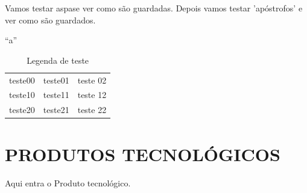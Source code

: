 \documentclass[
12pt,		%
openright,	%
twoside,  %
a4paper,			%
chapter=TITLE,		%
english,			%
french,				%
spanish,			%
brazil				%
]{USPSC-classe/USPSC}
\begin{document}
Vamos testar \textquotedbl aspas\textquotedbl  e ver como s\~ao guardadas. Depois vamos testar 'ap\'ostrofos' e ver como s\~ao guardados.














``a''


















\begin{table}[htb]
\tiny
\caption{\label{e1fee5245f1f580d36a53669e2e1e0d16ec34593}Legenda de teste}

\centering
\begin{tabular}{|c|c|c|}
\hline
teste00  &  teste01  &  teste 02 \\
teste10  &  teste11  &  teste 12 \\
teste20  &  teste21  &  teste 22 \\
\hline
\end{tabular}
\end{table}


\chapter[PRODUTOS TECNOL\'OGICOS]{PRODUTOS TECNOL\'OGICOS}\label{PRODUTOS TECNOL\'OGICOS}
Aqui entra o Produto tecnol\'ogico.
\end{document}
